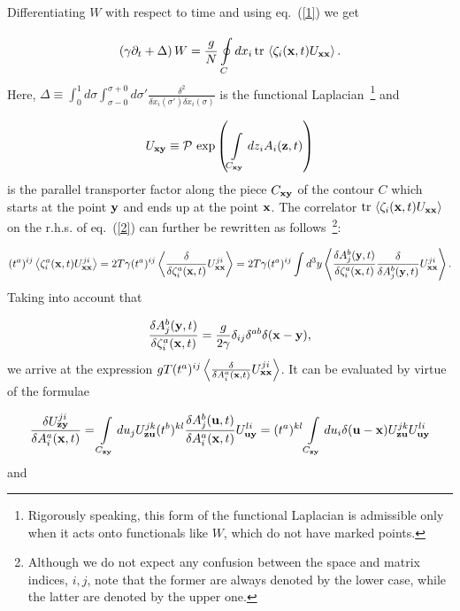 \documentclass[a4paper,12pt]{article}
\begin{document}
Differentiating $W$ with respect to time
and using eq.~(\ref{1}) we get

\begin{equation}
\label{2}
\left(\gamma\partial_t+\Delta\right)W=\frac{g}{N}
\oint\limits_{C}^{} dx_i{\,}{\rm tr}{\,}\left<\zeta_i({\bf x},t)U_{\bf xx}\right>.
\end{equation}
Here, $\Delta\equiv\int_{0}^{1}d\sigma\int_{\sigma-0}^{\sigma+0}d\sigma'\frac{\delta^2}{\delta x_i(\sigma')
\delta x_i(\sigma)}$ is the functional Laplacian~\footnote{Rigorously speaking, this form of the functional Laplacian is
admissible only when it acts onto functionals like $W$, which do not have marked points.} and

\begin{equation}
\label{u}
U_{\bf xy}\equiv{\cal P}{\,}\exp
\left(\int\limits_{C_{\bf xy}}^{} dz_i A_i({\bf z},t)\right)
\end{equation}
is the parallel transporter factor along the
piece $C_{\bf xy}$ of the contour $C$ which starts at the point ${\bf y}$ and ends up at the point ${\bf x}$.
The correlator ${\rm tr}{\,}\left<\zeta_i({\bf x},t)U_{\bf xx}\right>$ on the r.h.s. of eq.~(\ref{2})
can further be rewritten as follows~\footnote{Although we do not expect any confusion between the space and matrix indices, $i,j$,
note that the former are always denoted by the lower case, while the latter are denoted by the upper one.}:

$$
(t^a)^{ij}\left<\zeta_i^a({\bf x},t)U_{\bf xx}^{ji}\right>=
2T\gamma(t^a)^{ij}\left<\frac{\delta}{\delta\zeta_i^a({\bf x},t)}U_{\bf xx}^{ji}\right>=
2T\gamma(t^a)^{ij}\int d^3y\left<\frac{\delta A_j^b({\bf y},t)}{\delta\zeta_i^a({\bf x},t)}
\frac{\delta}{\delta A_j^b({\bf y},t)}U_{\bf xx}^{ji}\right>.$$
Taking into account that~\cite{zj}

\begin{equation}
\label{deriv}
\frac{\delta A_j^b({\bf y},t)}{\delta\zeta_i^a({\bf x},t)}=\frac{g}{2\gamma}
\delta_{ij}\delta^{ab}\delta({\bf x}-{\bf y}),
\end{equation}
we arrive at the expression
$gT(t^a)^{ij}\left<\frac{\delta}{\delta A_i^{a}({\bf x},t)}
U_{\bf xx}^{ji}\right>$. It can be evaluated by virtue of the formulae

$$
\frac{\delta U_{\bf zy}^{ji}}{\delta A_i^a({\bf x},t)}=\int\limits_{C_{\bf zy}}^{}du_jU_{\bf zu}^{jk}(t^b)^{kl}
\frac{\delta A_j^b({\bf u},t)}{\delta A_i^a({\bf x},t)}U_{\bf uy}^{li}=(t^a)^{kl}\int\limits_{C_{\bf zy}}^{}du_i\delta({\bf u}-{\bf x})
U_{\bf zu}^{jk}U_{\bf uy}^{li}$$
and
\end{document}
